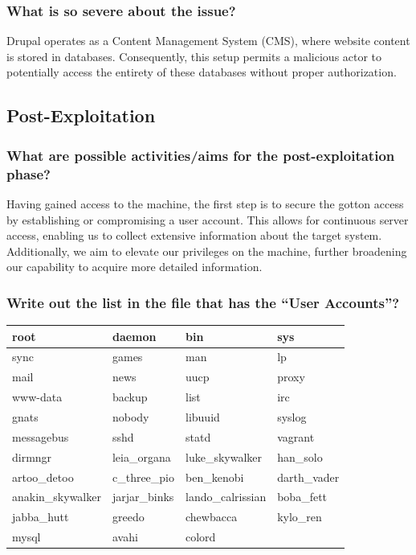 \subsubsection{What is so severe about the issue?}
Drupal operates as a Content Management System (CMS), where website content is stored in databases.
Consequently, this setup permits a malicious actor to potentially access the entirety of these databases without proper authorization.


\subsection{Post-Exploitation}

\subsubsection{What are possible activities/aims for the post-exploitation phase?}
Having gained access to the machine, the first step is to secure the gotton access by establishing or compromising a user account.
This allows for continuous server access, enabling us to collect extensive information about the target system.
Additionally, we aim to elevate our privileges on the machine, further broadening our capability to acquire more detailed information.

\subsubsection{Write out the list in the file that has the “User Accounts”?}

\begin{tabular}{|l|l|l|l|}
    \hline
    root              & daemon        & bin               & sys          \\
    \hline
    sync              & games         & man               & lp           \\
    \hline
    mail              & news          & uucp              & proxy        \\
    \hline
    www-data          & backup        & list              & irc          \\
    \hline
    gnats             & nobody        & libuuid           & syslog       \\
    \hline
    messagebus        & sshd          & statd             & vagrant      \\
    \hline
    dirmngr           & leia\_organa  & luke\_skywalker   & han\_solo    \\
    \hline
    artoo\_detoo      & c\_three\_pio & ben\_kenobi       & darth\_vader \\
    \hline
    anakin\_skywalker & jarjar\_binks & lando\_calrissian & boba\_fett   \\
    \hline
    jabba\_hutt       & greedo        & chewbacca         & kylo\_ren    \\
    \hline
    mysql             & avahi         & colord            &              \\
    \hline
\end{tabular}


